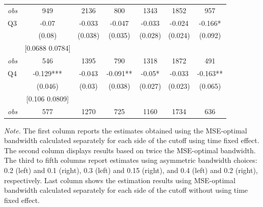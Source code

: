 \begin{table}[]
{\begin{tabular}{lcccccc}
\textit{obs} & 949 & 2136 & 800 & 1343 & 1852 & 957 \\ 
Q3 & -0.07 & -0.033 & -0.047 & -0.033 & -0.024 & -0.166* \\ 
&(0.08)&(0.038) & (0.035)&(0.028)&(0.024)&(0.092)\\ 
& [0.0688 0.0784] & & & & & \\ 
\textit{obs} & 546 & 1395 & 790 & 1318 & 1872 & 491 \\ 
Q4 & -0.129*** & -0.043 & -0.091** & -0.05* & -0.033 & -0.163** \\ 
&(0.046)&(0.03) & (0.038)&(0.027)&(0.023)&(0.065)\\ 
& [0.106 0.0809] & & & & & \\ 
\textit{obs} & 577 & 1270 & 725 & 1160 & 1734 & 636 \\ 
\hline 
\end{tabular}}{\textit{Note.} The first column reports the estimates obtained using the MSE-optimal bandwidth calculated separately for each side of the cutoff using time fixed effect. The second column displays results based on twice the MSE-optimal bandwidth. The third to fifth columns report estimates using asymmetric bandwidth choices: 0.2 (left) and 0.1 (right), 0.3 (left) and 0.15 (right), and 0.4 (left) and 0.2 (right), respectively. Last column shows the estimation results using MSE-optimal bandwidth calculated separately for each side of the cutoff without using time fixed effect.}
\end{table}

